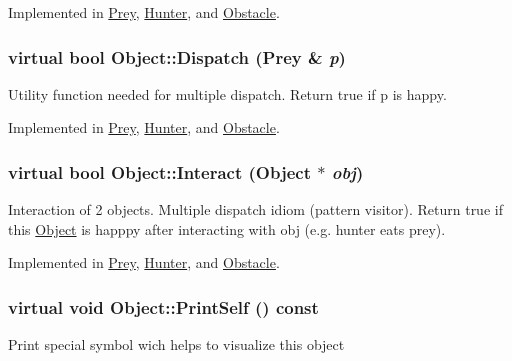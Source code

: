 Implemented in \hyperlink{classPrey_ac6b00aecc20017e58cabef00be961c6f}{Prey}, \hyperlink{classHunter_aa73667bb3b20a06d8c398eb2760e2902}{Hunter}, and \hyperlink{classObstacle_a8428a9d636c30b7c06d31066ad0dc412}{Obstacle}.

\hypertarget{classObject_a70097e3ad4433aec0dd0b938fcedfeca}{
\subsubsection[{Dispatch}]{\setlength{\rightskip}{0pt plus 5cm}virtual bool Object::Dispatch ({\bf Prey} \& {\em p})}}
\label{classObject_a70097e3ad4433aec0dd0b938fcedfeca}
Utility function needed for multiple dispatch. Return true if p is happy. 

Implemented in \hyperlink{classPrey_af37fdbe20f8868903d1ffdf4fb303946}{Prey}, \hyperlink{classHunter_aac1480382681187d650a9122dee9971c}{Hunter}, and \hyperlink{classObstacle_a930bb5cb375a6554ecc76f98a8ecaf0d}{Obstacle}.

\hypertarget{classObject_a27d03e80827229de2ce885a0bc1c83c0}{
\subsubsection[{Interact}]{\setlength{\rightskip}{0pt plus 5cm}virtual bool Object::Interact ({\bf Object} $\ast$ {\em obj})}}
\label{classObject_a27d03e80827229de2ce885a0bc1c83c0}
Interaction of 2 objects. Multiple dispatch idiom (pattern visitor). Return true if this \hyperlink{classObject}{Object} is happpy after interacting with obj (e.g. hunter eats prey). 

Implemented in \hyperlink{classPrey_a3f46445d442e33d47edcc94bf5f537b4}{Prey}, \hyperlink{classHunter_aad1bd13407503496a74ae1a6c689e64f}{Hunter}, and \hyperlink{classObstacle_a53bec243dc8a00f23ec61c915aef4c3e}{Obstacle}.

\hypertarget{classObject_a2c63e79dfa8626451b4a04b0b72294eb}{
\subsubsection[{PrintSelf}]{\setlength{\rightskip}{0pt plus 5cm}virtual void Object::PrintSelf () const}}
\label{classObject_a2c63e79dfa8626451b4a04b0b72294eb}
Print special symbol wich helps to visualize this object 

